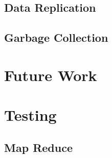 \documentclass[a4paper,12pt]{article}
\begin{document}
\subsection{Data Replication}
\subsection{Garbage Collection}

\section{Future Work}

\section{Testing}
\subsection{Map Reduce}
\end{document}
